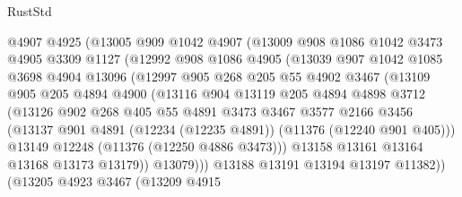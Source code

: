 \begin{lexlean}{RustStd}
\begin{coremodule}
{{{{{{{{{{{{{{{{{{{                @4907
                @4925
                (@13005
                  @909
                  @1042
                  @4907
                  (@13009
                    @908
                    @1086
                    @1042
                    @3473
                    @4905
                    @3309
                    @1127
                    (@12992
                      @908
                      @1086
                      @4905
                      (@13039
                        @907
                        @1042
                        @1085
                        @3698
                        @4904
                        @13096
                        (@12997
                          @905
                          @268
                          @205
                          @55
                          @4902
                          @3467
                          (@13109
                            @905
                            @205
                            @4894
                            @4900
                            (@13116
                              @904
                              @13119
                              @205
                              @4894
                              @4898
                              @3712
                              (@13126
                                @902
                                @268
                                @405
                                @55
                                @4891
                                @3473
                                @3467
                                @3577
                                @2166
                                @3456
                                (@13137
                                  @901
                                  @4891
                                  (@12234 (@12235 @4891))
                                  (@11376 (@12240 @901 @405)))
                                @13149
                                @12248
                                (@11376 (@12250 @4886 @3473)))
                              @13158
                              @13161
                              @13164
                              @13168
                              @13173
                              @13179))
                          @13079)))
                    @13188
                    @13191
                    @13194
                    @13197
                    @11382))
                (@13205
                  @4923
                  @3467
                  (@13209
                    @4915
}}}}}}}}}}}}}}}}}}}
\end{coremodule}
\end{lexlean}
